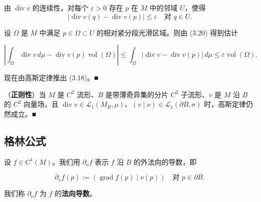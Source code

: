 \begin{remark}
\begin{items}
\proofhead
由 $ \operatorname{div} v $ 的连续性，对每个 $ \varepsilon > 0 $ 存在 $ p $ 在 $ M $ 中的邻域 $ U $，使得
\begin{equation}
|\operatorname{div} v(q) - \operatorname{div} v(p)| \le \varepsilon \quad \text{对 } q \in U.\tag{3.20}
\end{equation}

设 $ \Omega $ 是 $ M $ 中满足 $ p \in \Omega \subset U $ 的相对紧分段光滑区域。则由 (3.20) 得到估计

\[
\left| \int_\Omega \operatorname{div} v\, d\mu - \operatorname{div} v(p)\operatorname{vol}(\Omega) \right| \le \int_\Omega |\operatorname{div} v - \operatorname{div} v(p)|\, d\mu \le \varepsilon \operatorname{vol}(\Omega).
\]

现在由高斯定律推出 (3.18)。\nobreak\hspace{0.35em}■

\item

（\textbf{正则性}）当 $ M $ 是 $ C^2 $ 流形、$ B $ 是带薄奇异集的分片 $ C^2 $ 子流形、$ v $ 是 $ M $ 沿 $ B $ 的 $ C^2 $ 向量场，且 $ \operatorname{div} v \in \mathcal{L}_1(M_B,\mu) $、$ (v \mid \nu) \in \mathcal{L}_1(\partial B,\sigma) $ 时，高斯定律仍然成立。\nobreak\hspace{0.35em}■

\end{items}

\end{remark}

\subsection*{格林公式}

设 $ f \in C^1(M) $。我们用 $ \partial_\nu f $ 表示 $ f $ 沿 $ B $ 的外法向的导数，即

\[
\partial_\nu f(p) := (\operatorname{grad} f(p) \mid \nu(p)) \quad \text{对 } p \in \partial B.
\]

我们称 $ \partial_\nu f $ 为 $ f $ 的\textbf{法向导数}。

